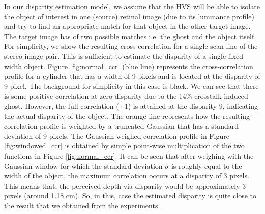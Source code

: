 In our disparity estimation model, we assume that the HVS will be able to isolate the object of interest in one (source) retinal image (due to its luminance profile) and try to find an appropriate match for that object in the other target image. The target image has of two possible matches i.e. the ghost and the object itself. For simplicity, we show the resulting cross-correlation for a single scan line of the stereo image pair. This is sufficient to estimate the disparity of a single fixed width object. Figure \ref{fig:normal_ccr} (blue line) represents the cross-correlation profile for a cylinder that has a width of 9 pixels and is located at the disparity of 9 pixel. The background for simplicity in this case is black. We can see that there is some positive correlation at zero disparity due to the 14\% crosstalk induced ghost. However, the full correlation (+1) is attained at the disparity 9, indicating the actual disparity of the object. The orange line represents how the resulting correlation profile is weighted by a truncated Gaussian that has a standard deviation of 9 pixels. The Gaussian weighed correlation profile in Figure \ref{fig:windowed_ccr} is obtained by simple point-wise multiplication of the two functions in Figure \ref{fig:normal_ccr}. It can be seen that after weighing with the Gaussian window for which the standard deviation $\sigma$ is roughly equal to the width of the object, the maximum correlation occurs at a disparity of 3 pixels. This means that, the perceived depth via disparity would be approximately 3 pixels (around 1.18 cm). So, in this, case the estimated disparity is quite close to the result that we obtained from the experiments.

